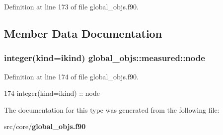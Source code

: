 Definition at line 173 of file global\+\_\+objs.\+f90.



\subsection{Member Data Documentation}
\subsubsection[{node}]{\setlength{\rightskip}{0pt plus 5cm}integer(kind=ikind) global\+\_\+objs\+::measured\+::node}\label{structglobal__objs_1_1measured_ab38d2a5b8632654ef7c6a2a2489e5de5}


Definition at line 174 of file global\+\_\+objs.\+f90.


\begin{DoxyCode}
174     \textcolor{keywordtype}{integer(kind=ikind)} :: node
\end{DoxyCode}


The documentation for this type was generated from the following file\+:\begin{DoxyCompactItemize}
\item 
src/core/{\bf global\+\_\+objs.\+f90}\end{DoxyCompactItemize}
